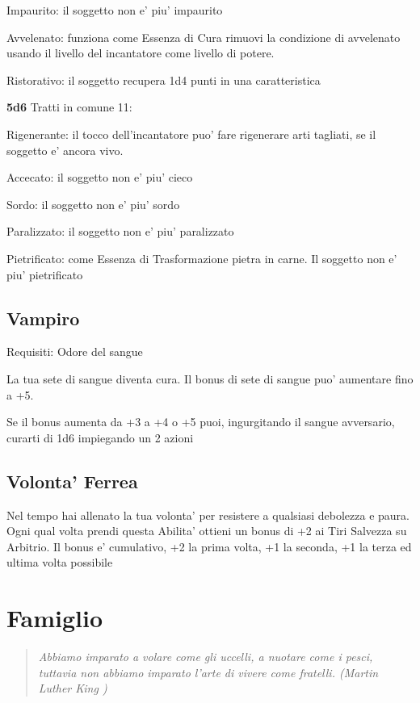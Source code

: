 \documentclass[a4paper,11pt,twoside,openany]{book}
\begin{document}
	Impaurito: il soggetto non e' piu' impaurito
	
	Avvelenato: funziona come Essenza di Cura rimuovi la condizione di avvelenato usando il livello del incantatore come livello di potere.
	
	Ristorativo: il soggetto recupera 1d4 punti in una caratteristica
	
	\textbf{5d6} Tratti in comune 11:
	
	Rigenerante: il tocco dell'incantatore puo' fare rigenerare arti tagliati, se il soggetto e' ancora vivo.
	
	Accecato: il soggetto non e' piu' cieco
	
	Sordo: il soggetto non e' piu' sordo
	
	Paralizzato: il soggetto non e' piu' paralizzato
	
	Pietrificato: come Essenza di Trasformazione pietra in carne. Il soggetto non e' piu' pietrificato
	
	\subsection{Vampiro}
	
	Requisiti: Odore del sangue
	
	La tua sete di sangue diventa cura. Il bonus di sete di sangue puo' aumentare fino a +5.
	
	Se il bonus aumenta da +3 a +4 o +5 puoi, ingurgitando il sangue avversario, curarti di 1d6 impiegando un 2 azioni
	
	\subsection{Volonta' Ferrea}
	
	Nel tempo hai allenato la tua volonta' per resistere a qualsiasi debolezza e paura. Ogni qual volta prendi questa Abilita' ottieni un bonus di +2 ai Tiri Salvezza su Arbitrio. Il bonus e' cumulativo, +2 la prima volta, +1 la seconda, +1 la terza ed ultima volta possibile
	
	\pagebreak
	
	\section{Famiglio}
	
	\label{famiglio}
	\begin{quote}\textit{
			Abbiamo imparato a volare come gli uccelli, a nuotare come i pesci, tuttavia non abbiamo imparato l'arte di vivere come fratelli. (Martin Luther King )
	}\end{quote}
	
\end{document}
